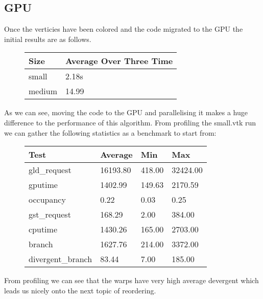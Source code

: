 \subsection*{GPU}
Once the verticies have been colored and the code migrated to the GPU the initial results are as follows.\\
\begin{figure}[H]\centering \begin{tabular}{ l | l }
  \hline
  Size & Average Over Three Time \\
  \hline
  \hline
  small & 2.18s \\
  medium & 14.99 \\
  \hline
\end{tabular} \end{figure}

As we can see, moving the code to the GPU and parallelising it makes a huge difference to the performance of this algorithm.
From profiling the small.vtk run we can gather the following statistics as a benchmark to start from:\\
\begin{figure}[H]\centering \begin{tabular}{ l | l | l | l}
\hline
Test & Average & Min & Max \\
\hline
\hline
gld\_request & 16193.80 & 418.00 & 32424.00 \\
gputime & 1402.99 & 149.63 & 2170.59 \\
occupancy & 0.22 & 0.03 & 0.25 \\
gst\_request & 168.29 & 2.00 & 384.00 \\
cputime & 1430.26 & 165.00 & 2703.00 \\
branch & 1627.76 & 214.00 & 3372.00 \\
divergent\_branch & 83.44 & 7.00 & 185.00 \\
\hline
\end{tabular} \end{figure}

From profiling we can see that the warps have very high average devergent which leads us nicely onto the next topic of reordering.
